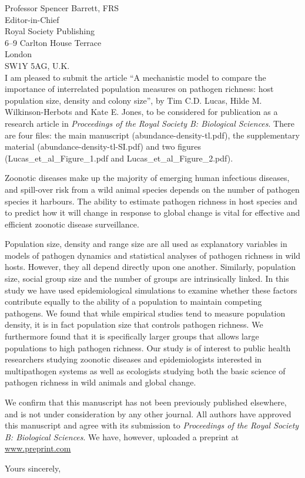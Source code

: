 \documentclass[10pt, a4paper]{letter} %
\begin{document}
\begin{letter}{
Professor Spencer Barrett, FRS\\
Editor-in-Chief\\
Royal Society Publishing\\
6--9 Carlton House Terrace\\
London\\
SW1Y 5AG, U.K.\\
}
I am pleased to submit the article ``A mechanistic model to compare the importance of interrelated population measures on pathogen richness: host population size, density and colony size'', by Tim C.D. Lucas, Hilde M. Wilkinson-Herbots and Kate E. Jones, to be considered for publication as a research article in \emph{Proceedings of the Royal Society B: Biological Sciences}.
There are four files: the main manuscript (abundance-density-tl.pdf), the supplementary material (abundance-density-tl-SI.pdf) and two figures (Lucas\_et\_al\_Figure\_1.pdf and Lucas\_et\_al\_Figure\_2.pdf).

Zoonotic diseases make up the majority of emerging human infectious diseases, and spill-over risk from a wild animal species depends on the number of pathogen species it harbours.
The ability to estimate pathogen richness in host species and to predict how it will change in response to global change is vital for effective and efficient zoonotic disease surveillance.

Population size, density and range size are all used as explanatory variables in models of pathogen dynamics and statistical analyses of pathogen richness in wild hosts.
However, they all depend directly upon one another.
Similarly, population size, social group size and the number of groups are intrinsically linked.
In this study we have used epidemiological simulations to examine whether these factors contribute equally to the ability of a population to maintain competing pathogens.
We found that while empirical studies tend to measure population density, it is in fact population size that controls pathogen richness.
We furthermore found that it is specifically larger groups that allows large populations to high pathogen richness.
Our study is of interest to public health researchers studying zoonotic diseases and epidemiologists interested in multipathogen systems as well as ecologists studying both the basic science of pathogen richness in wild animals and global change.

We confirm that this manuscript has not been previously published elsewhere, and is not under consideration by any other journal. All authors have approved this manuscript and agree with its submission to \emph{Proceedings of the Royal Society B: Biological Sciences}.
We have, however, uploaded a preprint at \hyperref[www.preprint.com]{www.preprint.com} %

\closing{Yours sincerely,}



\end{letter}
\end{document}
